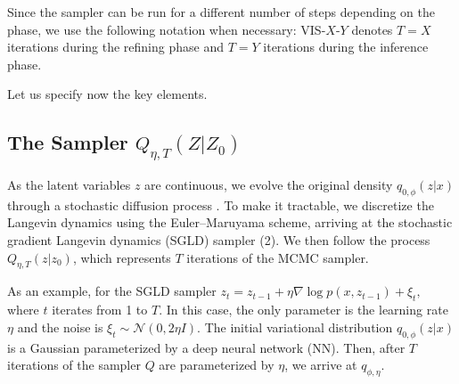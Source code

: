 \noindent Since the sampler can be run for a different number of steps depending on the phase, we use the following notation when necessary: VIS-$X$-$Y$ denotes $T = X$ iterations during the refining phase and $T=Y$ iterations during the inference phase.


Let us specify now the key elements.

\subsection*{The Sampler $Q_{ \eta, T}(Z|Z_0)$ } \label{sec:grad}

{ As the latent variables $z$ are continuous}, %
we evolve the original density $q_{0,\phi}(z|x)$ through a stochastic diffusion process \parencite{pavliotis2014stochastic}. To make it tractable, we discretize the Langevin dynamics using the Euler--Maruyama scheme, arriving at the stochastic gradient Langevin dynamics (SGLD) sampler (2). %
We then follow the process $Q_{\eta,T} (z | z_0)$,
which represents $T$ iterations of the MCMC sampler. 

As an example, for the SGLD sampler $z_t = z_{t-1} + \eta \nabla \log p(x, z_{t-1}) + \xi_{t},$ where $t$ iterates from 1 to $T$. In this case, the only parameter
is the learning rate $\eta$ and the noise is $\xi_t \sim \mathcal{N}(0, 2\eta I)$. %
The initial variational distribution $q_{0, \phi}(z|x)$ is a Gaussian parameterized by a deep neural network (NN). Then, after $T$ iterations of the sampler $Q$ are parameterized by $\eta$, we arrive at $q_{\phi, \eta}$. 

